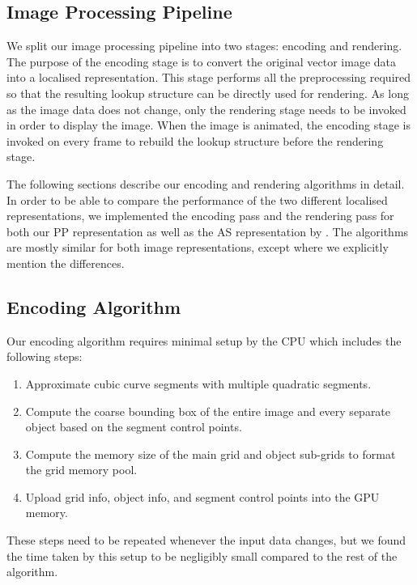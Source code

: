 \documentclass[11pt,a4paper,twoside]{article}
\begin{document}
\subsection {Image Processing Pipeline}

We split our image processing pipeline into two stages: encoding and rendering. The purpose of the encoding stage is to convert the original vector image data into a localised representation. This stage performs all the preprocessing required so that the resulting lookup structure can be directly used for rendering. As long as the image data does not change, only the rendering stage needs to be invoked in order to display the image. When the image is animated, the encoding stage is invoked on every frame to rebuild the lookup structure before the rendering stage.

The following sections describe our encoding and rendering algorithms in detail. In order to be able to compare the performance of the two different localised representations, we implemented the encoding pass and the rendering pass for both our PP representation as well as the AS representation by \cite{NehabHoppe08}. The algorithms are mostly similar for both image representations, except where we explicitly mention the differences.

\subsection {Encoding Algorithm}

%
Our encoding algorithm requires minimal setup by the CPU which includes the following steps:

\begin {enumerate}
\item
Approximate cubic curve segments with multiple quadratic segments.
\item
Compute the coarse bounding box of the entire image and every separate object based on the segment control points.
\item
Compute the memory size of the main grid and object sub-grids to format the grid memory pool.
\item
Upload grid info, object info, and segment control points into the GPU memory.
\end {enumerate}
These steps need to be repeated whenever the input data changes, but we found the time taken by this setup to be negligibly small compared to the rest of the algorithm.
\end{document}

